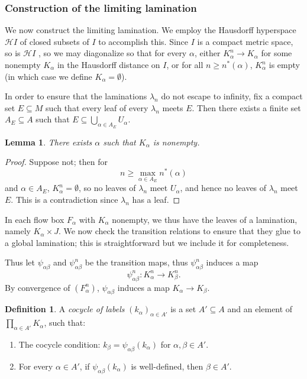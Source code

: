 \documentclass[reqno,11pt]{amsart}
\newcommand{\Hypspace}{\mathscr H}
\newcommand{\dfn}[1]{\emph{#1}\index{#1}}
\newtheorem{lemma}[theorem]{Lemma}
\theoremstyle{definition}
\newtheorem{definition}[theorem]{Definition}
\numberwithin{equation}{section}
\begin{document}

\subsubsection{Construction of the limiting lamination}
We now construct the limiting lamination.
We employ the Hausdorff hyperspace $\Hypspace I$ of closed subsets of $I$ to accomplish this.
Since $I$ is a compact metric space, so is $\Hypspace I$ \cite[Theorem 4.17]{nadler2017continuum}, so we may diagonalize so that for every $\alpha$, either $K^n_\alpha \to K_\alpha$ for some nonempty $K_\alpha$ in the Hausdorff distance on $I$, or for all $n \geq n^*(\alpha)$, $K_\alpha^n$ is empty (in which case we define $K_\alpha = \emptyset$).

In order to ensure that the laminations $\lambda_n$ do not escape to infinity, fix a compact set $E \subseteq M$ such that every leaf of every $\lambda_n$ meets $E$.
Then there exists a finite set $A_E \subseteq A$ such that $E \subseteq \bigcup_{\alpha \in A_E} U_\alpha$.

\begin{lemma}\label{label sets are nonempty}
	There exists $\alpha$ such that $K_\alpha$ is nonempty.
\end{lemma}
\begin{proof}
	Suppose not; then for
	$$n \geq \max_{\alpha \in A_E} n^*(\alpha)$$
	and $\alpha \in A_E$, $K_\alpha^n = \emptyset$, so no leaves of $\lambda_n$ meet $U_\alpha$, and hence no leaves of $\lambda_n$ meet $E$.
	This is a contradiction since $\lambda_n$ has a leaf.
\end{proof}

In each flow box $F_\alpha$ with $K_\alpha$ nonempty, we thus have the leaves of a lamination, namely $K_\alpha \times J$.
We now check the transition relations to ensure that they glue to a global lamination; this is straightforward but we include it for completeness.

Thus let $\psi_{\alpha \beta}$ and $\psi_{\alpha \beta}^n$ be the transition maps, thus $\psi_{\alpha \beta}^n$ induces a map
$$\psi_{\alpha \beta}^n: K_\alpha^n \to K_\beta^n.$$
By convergence of $(F_\alpha^n)$, $\psi_{\alpha \beta}$ induces a map $K_\alpha \to K_\beta$.

\begin{definition}
	A \dfn{cocycle of labels} $(k_\alpha)_{\alpha \in A'}$ is a set $A' \subseteq A$ and an element of $\prod_{\alpha \in A'} K_\alpha$, such that:
\begin{enumerate}
	\item The cocycle condition: $k_\beta = \psi_{\alpha \beta}(k_\alpha)$ for $\alpha, \beta \in A'$.
	\item For every $\alpha \in A'$, if $\psi_{\alpha \beta}(k_\alpha)$ is well-defined, then $\beta \in A'$.
\end{enumerate}
\end{definition}
\end{document}
